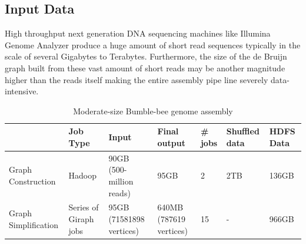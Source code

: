 \documentclass[conference]{IEEEtran}
\begin{document}
\subsection {Input Data} \label{InputData}
High throughput next generation DNA sequencing machines like Illumina Genome Analyzer produce a huge amount of short read sequences typically in the scale of several Gigabytes to Terabytes.
Furthermore, the size of the de Bruijn graph built from these vast amount of short reads may be another magnitude higher than the reads itself making the entire assembly pipe line severely data-intensive.
\begin{table}
\begin{center}
    \begin{tabular}{ |p{1.1cm} | p{0.8cm} | p{1.1cm} | p{0.8cm} | p{0.8cm} | p{0.8cm} | p{0.8cm}|} \hline
    & Job Type & Input & Final output & \# jobs & Shuffled data & HDFS Data \\ \hline
    Graph Construction & Hadoop & 90GB (500-million reads) & 95GB & 2 & 2TB & 136GB \\ \hline
    Graph Simplification & Series of Giraph jobs & 95GB (71581898 vertices) & 640MB (787619 vertices) & 15 & - & 966GB \\ \hline
    \end{tabular}
    \caption{Moderate-size Bumble-bee genome assembly}
	\label{table:BumbleBeeData}
\end{center}
\end{table}
\end{document}
